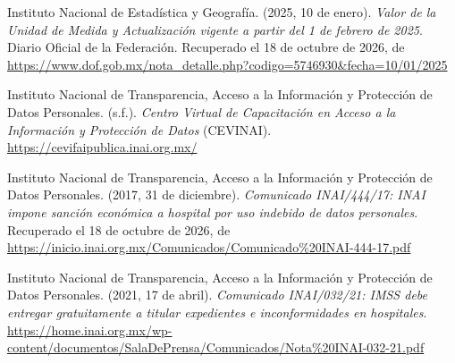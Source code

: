 \documentclass[12pt, a4paper]{article}
\begin{document}
\begin{list}{}{\setlength{\leftmargin}{1.27cm}\setlength{\itemindent}{-1.27cm}%
  \setlength{\labelwidth}{0pt}\setlength{\labelsep}{0pt}\setlength{\itemsep}{6pt}}

\item Instituto Nacional de Estadística y Geografía. (2025,
  10 de enero). \textit{Valor de la Unidad de Medida y
  Actualización vigente a partir del 1 de febrero de 2025}.
  Diario Oficial de la Federación.
  Recuperado el 18 de octubre de 2026, de \url{https://www.dof.gob.mx/nota_detalle.php?codigo=5746930&fecha=10/01/2025}


\item Instituto Nacional de Transparencia, Acceso a la Información
  y Protección de Datos Personales. (s.f.). \textit{Centro Virtual de
  Capacitación en Acceso a la Información y Protección de Datos}
  (CEVINAI). \url{https://cevifaipublica.inai.org.mx/}
 

\item Instituto Nacional de Transparencia, Acceso a la Información
  y Protección de Datos Personales. (2017, 31 de diciembre).
  \textit{Comunicado INAI/444/17: INAI impone sanción económica a
  hospital por uso indebido de datos personales}. Recuperado el 18 de octubre de 2026, de \url{https://inicio.inai.org.mx/Comunicados/Comunicado%20INAI-444-17.pdf}
 
  
\item Instituto Nacional de Transparencia, Acceso a la Información
  y Protección de Datos Personales. (2021, 17 de abril).
  \textit{Comunicado INAI/032/21: IMSS debe entregar gratuitamente
  a titular expedientes e inconformidades en hospitales}.
  \url{https://home.inai.org.mx/wp-content/documentos/SalaDePrensa/Comunicados/Nota%20INAI-032-21.pdf}


\end{list}
\end{document}
